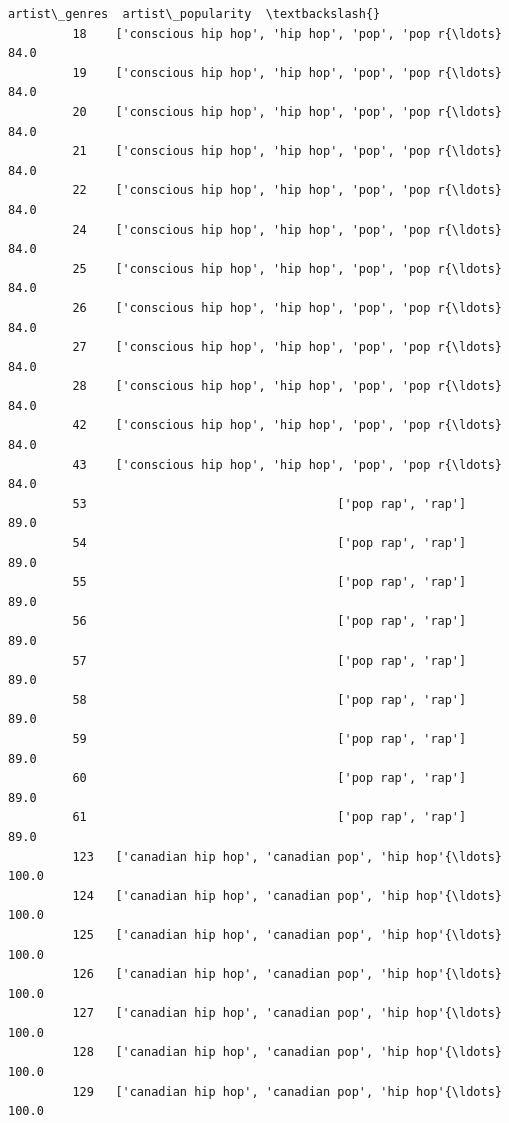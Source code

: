 \documentclass[11pt]{article}
\begin{document}
\begin{Verbatim}[commandchars=\\\{\}]
                                                   artist\_genres  artist\_popularity  \textbackslash{}
         18    ['conscious hip hop', 'hip hop', 'pop', 'pop r{\ldots}               84.0   
         19    ['conscious hip hop', 'hip hop', 'pop', 'pop r{\ldots}               84.0   
         20    ['conscious hip hop', 'hip hop', 'pop', 'pop r{\ldots}               84.0   
         21    ['conscious hip hop', 'hip hop', 'pop', 'pop r{\ldots}               84.0   
         22    ['conscious hip hop', 'hip hop', 'pop', 'pop r{\ldots}               84.0   
         24    ['conscious hip hop', 'hip hop', 'pop', 'pop r{\ldots}               84.0   
         25    ['conscious hip hop', 'hip hop', 'pop', 'pop r{\ldots}               84.0   
         26    ['conscious hip hop', 'hip hop', 'pop', 'pop r{\ldots}               84.0   
         27    ['conscious hip hop', 'hip hop', 'pop', 'pop r{\ldots}               84.0   
         28    ['conscious hip hop', 'hip hop', 'pop', 'pop r{\ldots}               84.0   
         42    ['conscious hip hop', 'hip hop', 'pop', 'pop r{\ldots}               84.0   
         43    ['conscious hip hop', 'hip hop', 'pop', 'pop r{\ldots}               84.0   
         53                                   ['pop rap', 'rap']               89.0   
         54                                   ['pop rap', 'rap']               89.0   
         55                                   ['pop rap', 'rap']               89.0   
         56                                   ['pop rap', 'rap']               89.0   
         57                                   ['pop rap', 'rap']               89.0   
         58                                   ['pop rap', 'rap']               89.0   
         59                                   ['pop rap', 'rap']               89.0   
         60                                   ['pop rap', 'rap']               89.0   
         61                                   ['pop rap', 'rap']               89.0   
         123   ['canadian hip hop', 'canadian pop', 'hip hop'{\ldots}              100.0   
         124   ['canadian hip hop', 'canadian pop', 'hip hop'{\ldots}              100.0   
         125   ['canadian hip hop', 'canadian pop', 'hip hop'{\ldots}              100.0   
         126   ['canadian hip hop', 'canadian pop', 'hip hop'{\ldots}              100.0   
         127   ['canadian hip hop', 'canadian pop', 'hip hop'{\ldots}              100.0   
         128   ['canadian hip hop', 'canadian pop', 'hip hop'{\ldots}              100.0   
         129   ['canadian hip hop', 'canadian pop', 'hip hop'{\ldots}              100.0   

\end{Verbatim}
\end{document}
